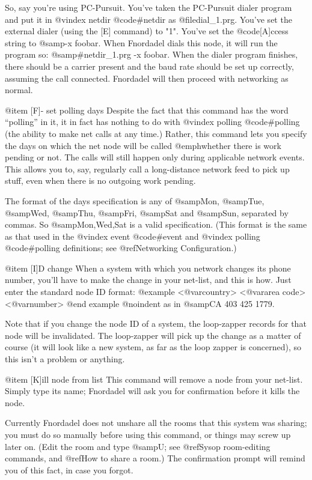 So, say you're using PC-Pursuit.  You've taken the
PC-Pursuit dialer program and put it in
@vindex netdir
@code{#netdir} as @file{dial_1.prg}.
You've set the external dialer (using the [E] command) to "1".
You've set the @code{[A]ccess} string to @samp{-x foobar}.  When Fnordadel
dials this node, it will run the program so:
@samp{#netdir\dial_1.prg -x foobar}.
When the dialer program finishes, there should be a
carrier present and the baud rate should be set up correctly,
assuming the call connected.  Fnordadel will then proceed
with networking as normal.

@item [F]- set polling days
Despite the fact that this command has the word ``polling''
in it, it in fact has nothing to do with
@vindex polling
@code{#polling} (the ability
to make net calls at any time.)  Rather, this command lets you
specify the days on which the net node will be called @emph{whether
there is work pending or not}.  The calls will still happen only during
applicable network events.  This allows you to, say, regularly
call a long-distance network feed to pick up stuff,
even when there is no outgoing work pending.

The format of the days specification is any of @samp{Mon},
@samp{Tue}, @samp{Wed}, @samp{Thu}, @samp{Fri}, @samp{Sat} and @samp{Sun},
separated by commas.
So @samp{Mon,Wed,Sat} is a valid specification.  (This format is the
same as that used in the
@vindex event
@code{#event} and
@vindex polling
@code{#polling} definitions;
see @ref{Networking Configuration}.)

@item [I]D change
When a system with which you network changes its phone
number, you'll have to make the change in your net-list, and this
is how.  Just enter the standard node ID format:
@example
<@var{country}> <@var{area code}> <@var{number}>
@end example
@noindent
as in @samp{CA 403 425 1779}.

Note that if you change the node ID of
a system, the loop-zapper records for that node will be
invalidated.  The loop-zapper will pick up the change as a matter
of course (it will look like a new system, as far as the loop
zapper is concerned), so this isn't a problem or anything.

@item [K]ill node from list
This command will remove a node from your net-list.
Simply type its name; Fnordadel will ask you for confirmation
before it kills the node.

Currently Fnordadel does not unshare all the rooms
that this system was sharing; you must do so manually before using
this command, or things may screw up later on.  (Edit the room and
type @samp{U}; see @ref{Sysop room-editing commands}, and
@ref{How to share a room}.)
The confirmation prompt will remind you of this fact, in case you forgot.

